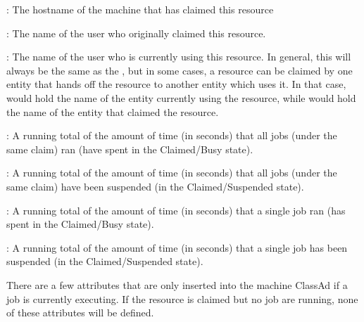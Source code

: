 \begin{description}

\item[\AdAttr{ClientMachine}] : The hostname of the machine that has
claimed this resource

\item[\AdAttr{RemoteOwner}] : The name of the user who originally
claimed this resource.

\item[\AdAttr{RemoteUser}] : The name of the user who is currently
using this resource.
In general, this will always be the same as the ,
but in some cases, a resource can be claimed by one entity that hands
off the resource to another entity which uses it.
In that case,  would hold the name of the entity
currently using the resource, while  would hold
the name of the entity that claimed the resource.

\item[\AdAttr{TotalClaimRunTime}] : A running total of the amount of
time (in seconds) that all jobs (under the same claim) ran
(have spent in the Claimed/Busy state).


\item[\AdAttr{TotalClaimSuspendTime}] :  A running total of the amount of
time (in seconds) that all jobs (under the same claim) have been
suspended (in the Claimed/Suspended state).

\item[\AdAttr{TotalJobRunTime}] :  A running total of the amount of
time (in seconds) that a single job ran
(has spent in the Claimed/Busy state).

\item[\AdAttr{TotalJobSuspendTime}] : A running total of the amount of
time (in seconds) that a single job has been suspended
(in the Claimed/Suspended state).

\end{description}

There are a few attributes that are only inserted into the
machine ClassAd if a job is currently executing.  
If the resource is claimed but no job are running, none of these
attributes will be defined.

